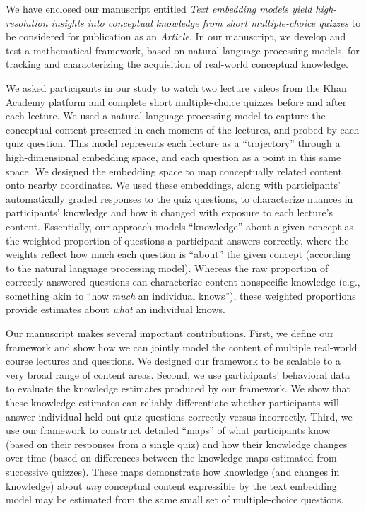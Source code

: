 \documentclass[11pt,stdletter,orderfromtodate,sigleft]{newlfm}
\newcommand{\articletype}{Article}
\newcommand{\myTitle}{Text embedding models yield high-resolution insights into conceptual knowledge from short multiple-choice quizzes}
\begin{document}
\begin{newlfm}

  We have enclosed our manuscript entitled \textit{\myTitle} to be considered for
  publication as an \textit{\articletype}. In our manuscript, we develop and
  test a mathematical framework, based on natural language processing models,
  for tracking and characterizing the acquisition of real-world conceptual
  knowledge.

  We asked participants in our study to watch two lecture videos from the Khan Academy
  platform and complete short multiple-choice quizzes before and after each
  lecture. We used a natural language processing model to capture the
  conceptual content presented in each moment of the lectures, and probed by each quiz question. This
  model represents each lecture as a ``trajectory'' through a high-dimensional
  embedding space, and each question as a point in this same space. We designed
  the embedding space to map conceptually related content onto nearby
  coordinates. We used these embeddings, along with participants' automatically
  graded responses to the quiz questions, to characterize nuances in
  participants' knowledge and how it changed with exposure to each lecture's content. Essentially, our approach models ``knowledge'' about
  a given concept as the weighted proportion of questions a participant answers
  correctly, where the weights reflect how much each question is ``about'' the
  given concept (according to the natural language processing model). Whereas
  the raw proportion of correctly answered questions can characterize
  content-nonspecific knowledge (e.g., something akin to ``how \textit{much}
  an individual knows''), these weighted proportions provide estimates about
  \textit{what} an individual knows.

  Our manuscript makes several important contributions. First, we define our
  framework and show how we can jointly model the content of multiple
  real-world course lectures and questions. We designed our framework to be
  scalable to a very broad range of content areas. Second, we use participants'
  behavioral data to evaluate the knowledge estimates produced by our
  framework. We show that these knowledge estimates can reliably differentiate
  whether participants will answer individual held-out quiz questions correctly
  versus incorrectly. Third, we use our framework to construct detailed
  ``maps'' of what participants know (based on their responses from a single
  quiz) and how their knowledge changes over time (based on differences between
  the knowledge maps estimated from successive quizzes). These maps demonstrate
  how knowledge (and changes in knowledge) about \textit{any} conceptual
  content expressible by the text embedding model may be estimated from the
  same small set of multiple-choice questions.
  

\end{newlfm}
\end{document}
